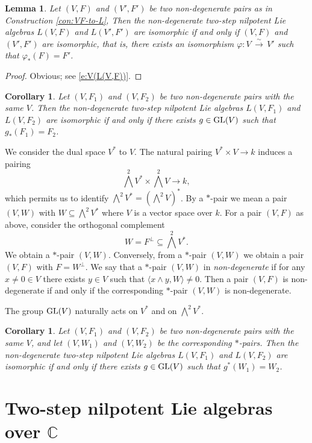 \documentclass[11pt]{amsart}
\theoremstyle{plain}
\newtheorem{lemma}[theorem]{Lemma}
\newtheorem{corollary}[theorem]{Corollary}
\theoremstyle{definition}
\newcommand{\C}{{\mathds C}}
\newcommand{\GL}{{\rm GL}}
\newcommand{\isoto}{{\,\overset\sim\longrightarrow\,}}
\renewcommand{\Lambda}{\textstyle\bigwedge}
\begin{document}
\begin{lemma}
Let  $(V,F)$ and $(V',F')$ be two non-degenerate pairs as in Construction \ref{con:VF-to-L},
Then  the non-degenerate two-step nilpotent Lie algebras $L(V,F)$ and $L(V',F')$ are isomorphic
if and only if $(V,F)$ and $(V',F')$ are isomorphic,
that is, there exists an isomorphism
$\varphi\colon V\isoto V'$
such that $\varphi_*(F)=F'$.
\end{lemma}

\begin{proof}
Obvious; see \eqref{e:V(L(V,F))}.
\end{proof}

\begin{corollary}\label{c:same-V}
Let $(V,F_1)$ and $(V,F_2)$ be two non-degenerate pairs with the same $V$.
Then  the non-degenerate two-step nilpotent Lie algebras $L(V,F_1)$ and $L(V,F_2)$ are isomorphic
if and only if there exists $g\in\GL(V)$
such that $g_*(F_1)=F_2$.
\end{corollary}

We consider the dual space $V^*$ to $V$. The natural pairing $V^*\times V\to k$ induces a pairing
\[ \Lambda^2 V^*\times \Lambda^2 V\to k,\]
which permits us to identify $\Lambda^2 V^* =(\Lambda^2 V)^*$.
By a $*$-pair we mean a pair  $(V, W)$ with $W\subseteq \Lambda^2 V^*$ where $V$ is a vector space over $k$.
For a pair $(V,F)$ as above, consider the orthogonal complement
\[ W=F^\bot\subseteq\Lambda^2 V^*.\]
We obtain a $*$-pair $(V, W)$.
Conversely, from a $*$-pair $(V,W)$ we obtain a pair $(V,F)$ with $F=W^\bot$.
We say that a $*$-pair $(V,W)$ in {\em non-degenerate}
if for any $x\neq 0\in V$ there exists $y\in V$ such that $\langle x\wedge y, W\rangle \neq 0$.
Then a pair $(V,F)$ is non-degenerate if and only if the corresponding $*$-pair $(V,W)$ is non-degenerate.

The group $\GL(V)$ naturally acts on $V^*$ and on $\Lambda^2 V^*$.

\begin{corollary}\label{c:same-V-*}
Let $(V,F_1)$ and $(V,F_2)$ be two non-degenerate pairs with the same $V$,
and let $(V,W_1)$ and $(V,W_2)$ be the corresponding $*$-pairs.
Then  the non-degenerate two-step nilpotent Lie algebras $L(V,F_1)$ and $L(V,F_2)$ are isomorphic
if and only if there exists $g\in\GL(V)$
such that $g^*(W_1)=W_2$.
\end{corollary}





\section{Two-step nilpotent Lie algebras over $\C$}
\label{s:2-C}
\end{document}
